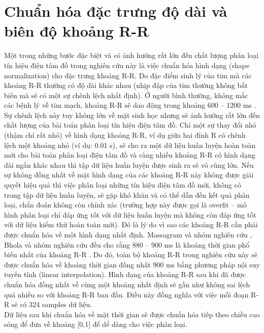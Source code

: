 \section{Chuẩn hóa đặc trưng độ dài và biên độ khoảng R-R }
Một trong những bước đặc biệt và có ảnh hưởng rất lớn đến chất lượng phân loại tín hiệu điện tâm đồ trong nghiên cứu này là việc chuẩn hóa hình dạng (shape normalization) cho đặc trưng khoảng R-R. Do đặc điểm sinh lý của tim mà các khoảng R-R thường có độ dài khác nhau (nhịp đập của tim thường không bất biến mà sẽ có một sự chênh lệch nhất định). Ở người bình thường, không mắc các bệnh lý về tim mạch, khoảng R-R sẽ dao động trong khoảng 600 – 1200 ms \cite{64} . Sự chênh lệch này tuy không lớn về mặt sinh học nhưng sẽ ảnh hưởng rất lớn đến chất lượng của bài toán phân loại tín hiệu điện tâm đồ. Chỉ một sự thay đổi nhỏ (thậm chí rất nhỏ) về hình dạng khoảng R-R, ví dụ giữa hai đỉnh R có chênh lệch một khoảng nhỏ (ví dụ: 0.01 s), sẽ cho ra một dữ liệu huấn luyện hoàn toàn mới cho bài toán phân loại điện tâm đồ và càng nhiều khoảng R-R có hình dạng dài ngắn khác nhau thì tập dữ liệu huấn luyện được sinh ra sẽ vô cùng lớn. Nếu sự không đồng nhất về mặt hình dạng của các khoảng R-R này không được giải quyết hiệu quả thì việc phân loại những tín hiệu điện tâm đồ mới, không có trong tập dữ liệu huấn luyện, sẽ gặp khó khăn và có thể dẫn đến kết quả phân loại, chẩn đoán không còn chính xác (trường hợp này được gọi là overfit – mô hình phân loại chỉ đáp ứng tốt với dữ liệu huấn luyện mà không còn đáp ứng tốt với dữ liệu kiểm thử hoàn toàn mới). Đó là lý do vì sao các khoảng R-R cần phải được chuẩn hóa về một hình dạng nhất định. Massagram và nhóm nghiên cứu \cite{67}, Bhola và nhóm nghiên cứu đều cho rằng 880 – 900 ms là khoảng thời gian phổ biến nhất của khoảng R-R \cite{68}. Do đó, toàn bộ khoảng R-R trong nghiên cứu này sẽ được chuẩn hóa về khoảng thời gian đồng nhất 900 ms bằng phương pháp nội suy tuyến tính (linear interpolation). Hình dạng của khoảng R-R sau khi đã được chuẩn hóa đồng nhất về cùng một khoảng nhất định sẽ gần như không sai lệch quá nhiều so với khoảng R-R ban đầu. Điều này đồng nghĩa với việc mỗi đoạn R-R sẽ có 324 samples dữ liệu.\\
Dữ liệu sau khi chuẩn hóa về mặt thời gian sẽ được chuẩn hóa tiếp theo chiều cao sóng để đưa về khoảng [0,1] để dể dàng cho việc phân loại.

